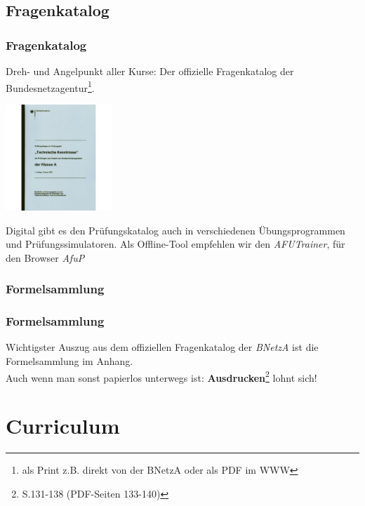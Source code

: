 \subsection{Fragenkatalog}

\begin{frame}
    \frametitle{Fragenkatalog}

    Dreh- und Angelpunkt aller Kurse: Der offizielle Fragenkatalog der
    Bundesnetzagentur\footnote{als Print z.B. direkt von der BNetzA oder als PDF im WWW}.

    \begin{center}
        \includegraphics[width=0.3\textwidth]{a00/Fragenkatalog-Klasse-A-Technische-Kenntnisse.jpg}
        \tiny \hyperlink{refs}{\cite{darcv}}
    \end{center}

    Digital gibt es den Prüfungskatalog auch in verschiedenen Übungsprogrammen
    und Prüfungssimulatoren. Als Offline-Tool empfehlen wir den
    \emph{AFUTrainer}\hyperlink{refs}{\cite{afut}}, für den Browser
    \emph{AfuP}\hyperlink{refs}{\cite{afup}}

\end{frame}

\subsubsection{Formelsammlung}

\begin{frame}
    \frametitle{Formelsammlung}

    Wichtigster Auszug aus dem offiziellen Fragenkatalog der \emph{BNetzA} ist
    die Formelsammlung im Anhang. \\[3em]

    Auch wenn man sonst papierlos unterwegs ist:
    \textbf{Ausdrucken}\footnote{S.131-138 (PDF-Seiten 133-140)} lohnt sich!

\end{frame}

\section{Curriculum}

